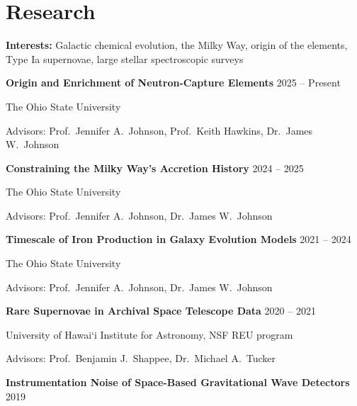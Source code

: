 \section*{Research}

\noindent
{\bf Interests:}
Galactic chemical evolution, the Milky Way, origin of the elements, Type Ia supernovae, large stellar spectroscopic surveys

\vspace{12pt}
\noindent
{\bf Origin and Enrichment of Neutron-Capture Elements}
\hfill 2025 -- Present

The Ohio State University

Advisors: Prof.\ Jennifer A.\ Johnson, Prof.\ Keith Hawkins, Dr.\ James W.\ Johnson
\vspace{12pt}

\noindent
{\bf Constraining the Milky Way's Accretion History}
\hfill 2024 -- 2025

The Ohio State University

Advisors: Prof.\ Jennifer A.\ Johnson, Dr.\ James W.\ Johnson
\vspace{12pt}

\noindent
{\bf Timescale of Iron Production in Galaxy Evolution Models}
\hfill 2021 -- 2024

The Ohio State University

Advisors: Prof.\ Jennifer A.\ Johnson, Dr.\ James W.\ Johnson
\vspace{12pt}

\noindent
{\bf Rare Supernovae in Archival Space Telescope Data}
\hfill 2020 -- 2021

University of Hawai`i Institute for Astronomy, NSF REU program

Advisors: Prof.\ Benjamin J.\ Shappee, Dr.\ Michael A.\ Tucker
\vspace{12pt}

\noindent
{\bf Instrumentation Noise of Space-Based Gravitational Wave Detectors}
\hfill 2019

